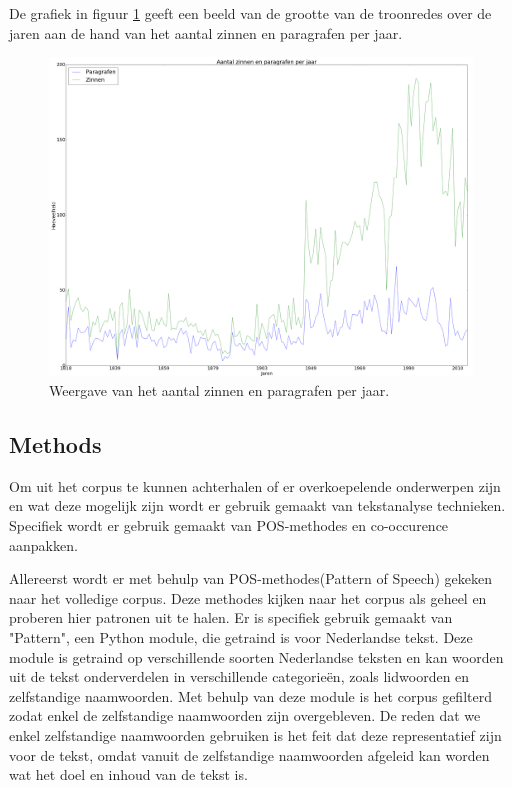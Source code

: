 De grafiek in figuur \ref{inhoud} geeft een beeld van de grootte van de troonredes over de jaren aan de hand van het aantal zinnen en paragrafen per jaar.

\begin{figure}[H]
\begin{center}
\includegraphics[width=1.2\textwidth]{fig/Inhoudverdeling}
\caption{\label{inhoud} Weergave van het aantal zinnen en paragrafen per jaar.}
\end{center}
\end{figure}

\pagebreak
\subsection{Methods}
Om uit het corpus te kunnen achterhalen of er overkoepelende onderwerpen zijn en wat deze mogelijk zijn wordt er gebruik gemaakt van tekstanalyse technieken. Specifiek wordt er gebruik gemaakt van POS-methodes en co-occurence aanpakken.~\cite{callon1991co}  

Allereerst wordt er met behulp van POS-methodes(Pattern of Speech) gekeken naar het volledige corpus. Deze methodes kijken naar het corpus als geheel en proberen hier patronen uit te halen. Er is specifiek gebruik gemaakt van "Pattern", een Python module, die getraind is voor Nederlandse tekst. Deze module is getraind op verschillende soorten Nederlandse teksten en kan woorden uit de tekst onderverdelen in verschillende categorieën, zoals lidwoorden en zelfstandige naamwoorden. Met behulp van deze module is het corpus gefilterd zodat enkel de zelfstandige naamwoorden zijn overgebleven. De reden dat we enkel zelfstandige naamwoorden gebruiken is het feit dat deze representatief zijn voor de tekst, omdat vanuit de zelfstandige naamwoorden afgeleid kan worden wat het doel en inhoud van de tekst is.

